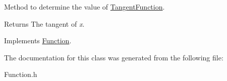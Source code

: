 Method to determine the value of \hyperlink{class_tangent_function}{Tangent\+Function}. 

\begin{DoxyReturn}{Returns}
The tangent of {\itshape x}. 
\end{DoxyReturn}


Implements \hyperlink{class_function_a7773feae8f1def0a2d7e479363700816}{Function}.



The documentation for this class was generated from the following file\+:\begin{DoxyCompactItemize}
\item 
Function.\+h\end{DoxyCompactItemize}
